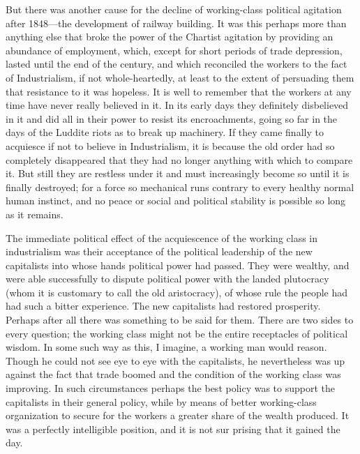 \documentclass{book}
\begin{document}
But there was another cause for the decline of working-class political agitation after 1848—the development of railway building. It was this perhaps more than anything else that broke the power of the Chartist agitation by providing an abundance of employment, which, except for short periods of trade depression, lasted until the end of the century, and which reconciled the workers to the fact of Industrialism, if not whole-heartedly, at least to the extent of persuading them that resistance to it was hopeless. It is well to remember that the workers at any time have never really believed in it. In its early days they definitely disbelieved in it and did all in their power to resist its encroachments, going so far in the days of the Luddite riots as to break up machinery. If they came finally to acquiesce if not to believe in Industrialism, it is because the old order had so completely disappeared that they had no longer anything with which to compare it. But still they are restless under it and must increasingly become so until it is finally destroyed; for a force so mechanical runs contrary to every healthy normal human instinct, and no peace or social and political stability is possible so long as it remains.

The immediate political effect of the acquiescence of the working class in industrialism was their acceptance of the political leadership of the new capitalists into whose hands political power had passed. They were wealthy, and were able successfully to dispute political power with the landed plutocracy (whom it is customary to call the old aristocracy), of whose rule the people had had such a bitter experience. The new capitalists had restored prosperity. Perhaps after all there was something to be said for them. There are two sides to every question; the working class might not be the entire receptacles of political wisdom. In some such way as this, I imagine, a working man would reason. Though he could not see eye to eye with the capitalists, he nevertheless was up against the fact that trade boomed and the condition of the working class was improving. In such circumstances perhaps the best policy was to support the capitalists in their general policy, while by means of better working-class organization to secure for the workers a greater share of the wealth produced. It was a perfectly intelligible position, and it is not sur prising that it gained the day.
\end{document}
